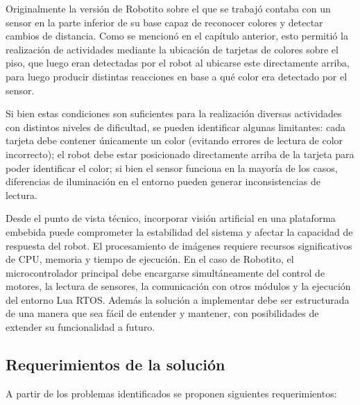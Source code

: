 \documentclass{prgrado}
\begin{document}
Originalmente la versión de Robotito sobre el que se trabajó contaba con un sensor en la parte inferior de su base capaz de reconocer colores y detectar cambios de distancia. Como se mencionó en el capítulo anterior, esto permitió la realización de actividades mediante la ubicación de tarjetas de colores sobre el piso, que luego eran detectadas por el robot al ubicarse este directamente arriba, para luego producir distintas reacciones en base a qué color era detectado por el sensor. 

Si bien estas condiciones son suficientes para la realización diversas actividades con distintos niveles de dificultad, se pueden identificar algunas limitantes: cada tarjeta debe contener únicamente un color (evitando errores de lectura de color incorrecto); el robot debe estar posicionado directamente arriba de la tarjeta para poder identificar el color; si bien el sensor funciona en la mayoría de los casos, diferencias de iluminación en el entorno pueden generar inconsistencias de lectura.

Desde el punto de vista técnico, incorporar visión artificial en una plataforma embebida puede comprometer la estabilidad del sistema y afectar la capacidad de respuesta del robot. El procesamiento de imágenes requiere recursos significativos de CPU, memoria y tiempo de ejecución. En el caso de Robotito, el microcontrolador principal debe encargarse simultáneamente del control de motores, la lectura de sensores, la comunicación con otros módulos y la ejecución del entorno Lua RTOS. Además la solución a implementar debe ser estructurada de una manera que sea fácil de entender y mantener, con posibilidades de extender su funcionalidad a futuro.

\subsection{Requerimientos de la solución}

A partir de los problemas identificados se proponen siguientes requerimientos:
\end{document}
